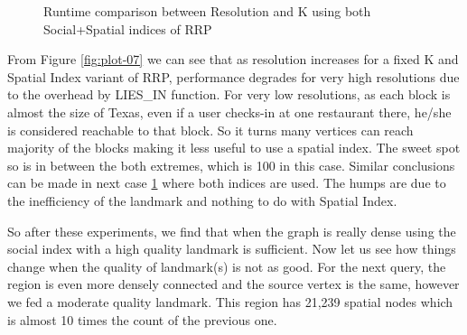 \begin{figure*}[t]
\begin{subfigure}[t]{0.5\textwidth}
		\caption{Runtime comparison between Resolution and K using both Social+Spatial indices of RRP}
		\label{fig:plot-08}
	\end{subfigure}
	\caption{Runtime comparison between Resolution and K for different types of RRP algorithms}
\end{figure*}

From Figure \ref{fig:plot-07} we can see that as resolution increases for a fixed K and Spatial Index variant of RRP, performance degrades for very high resolutions due to the overhead by LIES\_IN function. For very low resolutions, as each block is almost the size of Texas, even if a user checks-in at one restaurant there, he/she is considered reachable to that block. So it turns many vertices can reach majority of the blocks making it less useful to use a spatial index. The sweet spot so is in between the both extremes, which is 100 in this case. Similar conclusions can be made in next case \ref {fig:plot-08} where both indices are used. The humps are due to the inefficiency of the landmark and nothing to do with Spatial Index.

So after these experiments, we find that when the graph is really dense using the social index with a high quality landmark is sufficient. Now let us see how things change when the quality of landmark(s) is not as good. For the next query, the region is even more densely connected and the source vertex is the same, however we fed a moderate quality landmark. This region has 21,239 spatial nodes which is almost 10 times the count of the previous one.

